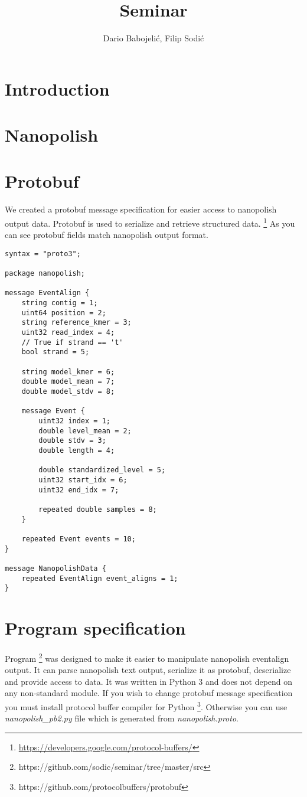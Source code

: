 \documentclass[]{article}
\title{Seminar}
\author{Dario Babojelić, Filip Sodić}
\begin{document}
\maketitle
\tableofcontents
\newpage

\section{Introduction}
\section{Nanopolish}


\newpage
\section{Protobuf}
We created a protobuf message specification for easier access to nanopolish 
output data. Protobuf is used to serialize and retrieve structured data.
\footnote{\url{https://developers.google.com/protocol-buffers/}}
As you can see protobuf fields match nanopolish output format. 

\begin{lstlisting}
syntax = "proto3";

package nanopolish;

message EventAlign {
	string contig = 1;
	uint64 position = 2;
	string reference_kmer = 3;
	uint32 read_index = 4;
	// True if strand == 't'
	bool strand = 5;

	string model_kmer = 6;
	double model_mean = 7;
	double model_stdv = 8;

	message Event {
		uint32 index = 1;
		double level_mean = 2;
		double stdv = 3;
		double length = 4;

		double standardized_level = 5;
		uint32 start_idx = 6;
		uint32 end_idx = 7;

		repeated double samples = 8;
	}

	repeated Event events = 10;
}

message NanopolishData {
	repeated EventAlign event_aligns = 1;
}
\end{lstlisting}



\section{Program specification}
Program 
\footnote{https://github.com/sodic/seminar/tree/master/src}
was designed to make it easier to manipulate nanopolish eventalign 
output. It can parse nanopolish text output, serialize it as protobuf, 
deserialize and provide access to data. It was written in Python 3 and does
not depend on any non-standard module. If you wish to change protobuf message
specification you must install protocol buffer compiler for Python
\footnote{https://github.com/protocolbuffers/protobuf}.
Otherwise you can use \textit{nanopolish\_pb2.py} file which is generated from
\textit{nanopolish.proto}.
\end{document}

